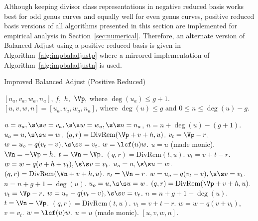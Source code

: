 Although keeping divisor class representations in negative reduced basis works
best for odd genus curves and equally well for even genus curves, positive
reduced basis versions of all algorithms presented in this section are
implemented for empirical analysis in Section~\ref{sec:numerical}. Therefore, an
alternate version of Balanced Adjust using a positive reduced basis is given in
Algorithm~\ref{alg:impbaladjustp} where a mirrored implementation of
Algorithm~\ref{alg:impbaladjustn} is used.

\begin{algorithm}[htbp]
    \caption{Improved Balanced Adjust (Positive Reduced)}
    \label{alg:impbaladjustp}
    \begin{algorithmic}[1]
        \Require $[u_a,v_a, w_a, n_a]$, $f,$ $h,$ $\Vp,$ where $ \deg(u_a) \leq g+1$.
        \Ensure $[u,v,w,n] = [u_a,v_a, w_a, n_a]$, where $\deg(u) \leq g$ and 
                $0 \leq n \leq \deg(u) - g$.

        \State  $u = u_a, \s\s v = v_a, \s\s w = w_a, \s\s n = n_a$,
                \State $n = n + \deg(u) -(g+1)$.
                \State $u_o = u, \s\s u = w$.
                \State $(q,r) = \mathrm{DivRem}(\Vp + v + h,u)$.
                \State $v_t = \Vp - r$.
                \State $w = u_o - q(v_t - v), \s\s v = v_t$.
            \EndWhile
            \State $w = \lcf(u)w$.
            \State $u = u$ (made monic).
            \State $\Vn = -\Vp - h$.
            \State $t = \Vn -\Vp$.
            \State $(q,r) = \mathrm{DivRem}(t,u)$.
            \State $v_t = v + t - r$.
            \State $w = w - q(v + h + v_t), \s\s v = v_t$.
                \State $u_o = u, \s\s u = w$.
                \State $(q,r) = \mathrm{DivRem}(\Vn + v + h,u)$.
                \State $v_t = \Vn - r$.
                \State $w = u_o - q(v_t - v), \s\s v = v_t$.
                \State $n = n + g + 1 - \deg(u)$.
            \EndWhile
                \State $u_o = u, \s\s u = w$.
                \State $(q,r) = \mathrm{DivRem}(\Vp + v + h,u)$.
                \State $v_t = \Vp - r$.
                \State $w = u_o - q(v_t - v), \s\s v = v_t$.
                \State $n = n + g + 1 - \deg(u)$.
            \Else
                \State $t = \Vn - \Vp$.
                \State $(q,r) = \mathrm{DivRem}(t,u)$.
                \State $v_t = v + t - r$.
                \State $w = w - q(v + v_t)$, $v = v_t$.
            \EndIf
            \State $w = \lcf(u)w$.
            \State $u = u$ (made monic).
        \EndIf
        \State \Return $[u,v,w,n]$.
    \end{algorithmic}
\end{algorithm}


